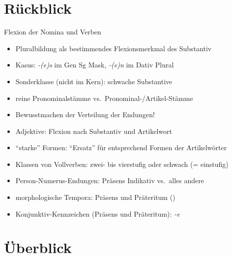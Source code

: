 
\section{Rückblick}

\begin{frame}
  {Flexion der Nomina und Verben}
  \pause
  \begin{itemize}[<+->]
    \item Pluralbildung als bestimmendes Flexionsmerkmal des Substantiv
    \item Kasus: \textit{-(e)s} im Gen Sg Mask, \textit{-(e)n} im Dativ Plural
    \item Sonderklasse (nicht im Kern): schwache Substantive
      \Halbzeile
    \item reine Pronominalstämme vs.\ Pronominal-\slash Artikel-Stämme
    \item \alert{Bewusstmachen der Verteilung der Endungen!}
      \Halbzeile
    \item Adjektive: Flexion nach Substantiv \alert{und} Artikelwort
    \item "`starke"' Formen: "`Ersatz"' für entsprechend Formen der Artikelwörter
      \Halbzeile
    \item Klassen von Vollverben: zwei- bis vierstufig oder schwach (= einstufig)
    \item Person-Numerus-Endungen: Präsens Indikativ vs.\ alles andere
    \item morphologische Tempora: Präsens und Präteritum ()
    \item Konjunktiv-Kennzeichen (Präsens und Präteritum): \textit{-e}
  \end{itemize}
\end{frame}


\section{Überblick}

